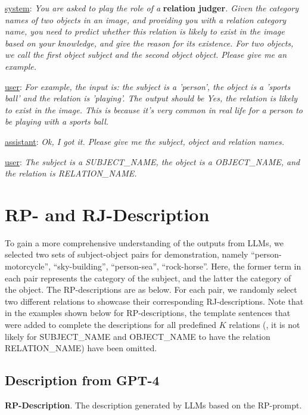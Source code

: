 \underline{system}: \textit{You are asked to play the role of a} \textbf{relation judger}\textit{. Given the category names of two objects in an image, and providing you with a relation category name, you need to predict whether this relation is likely to exist in the image based on your knowledge, and give the reason for its existence. For two objects, we call the first object subject and the second object object. Please give me an example.}

\underline{user}: \textit{For example, the input is: the subject is a 'person', the object is a 'sports ball' and the relation is 'playing'. The output should be Yes, the relation is likely to exist in the image. This is because it's very common in real life for a person to be playing with a sports ball.}

\underline{assistant}: \textit{Ok, I got it. Please give me the subject, object and relation names.}

\underline{user}: \textit{The subject is a SUBJECT\_NAME, the object is a OBJECT\_NAME, and the relation is RELATION\_NAME.}


\section{RP- and RJ-Description}
\label{sec:description}

To gain a more comprehensive understanding of the outputs from LLMs, we selected two sets of subject-object pairs for demonstration, namely ``person-motorcycle'', ``sky-building'', ``person-sea'',  ``rock-horse''.
Here, the former term in each pair represents the category of the subject, and the latter the category of the object.
The RP-descriptions are as below.
For each pair, we randomly select two different relations to showcase their corresponding RJ-descriptions.
Note that in the examples shown below for RP-descriptions, the template sentences that were added to complete the descriptions for all predefined $K$ relations (\eg, it is not likely for SUBJECT\_NAME and OBJECT\_NAME to have the relation RELATION\_NAME) have been omitted. 


\subsection{Description from GPT-4}

\noindent \textbf{RP-Description}.
The description generated by LLMs based on the RP-prompt.

